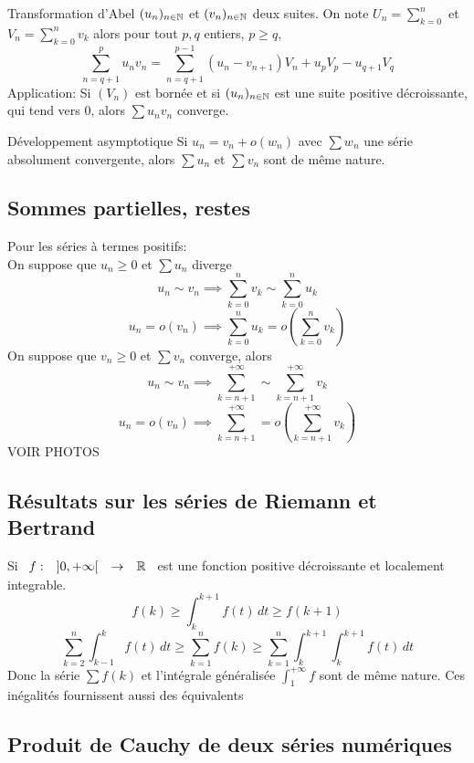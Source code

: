 \documentclass[]{report}
\begin{document}
\begin{dfprop}{Transformation d'Abel}{}
    $(u_n)_{n\in\mathbb{N}}$ et $(v_n)_{n\in\mathbb{N}}$ deux suites. On note $U_n=\sum_{k=0}^{n}$ et $V_n=\sum_{k=0}^{n} v_k$ alors pour tout $p,q$ entiers, $p\ge q$,
    \[\sum_{n=q+1}^{p} u_n v_n=\sum_{n=q+1}^{p-1}(u_n-v_{n+1}) V_n +u_p V_p -u_{q+1} V_q\]
    Application: Si $(V_n)$ est bornée et si $(u_n)_{n\in\mathbb{N}}$ est une suite positive décroissante, qui tend vers $0$, alors $\sum u_nv_n$ converge.
\end{dfprop}

\begin{dfprop}{Développement asymptotique}{}
    Si $u_n=v_n+o (w_n)$ avec $\sum w_n$ une série absolument convergente, alors $\sum u_n$ et $\sum v_n$ sont de même nature.
\end{dfprop}

\subsection*{Sommes partielles, restes}

Pour les séries à termes positifs:\\
On suppose que $u_n\ge 0$ et $\sum u_n$ diverge\\
\[u_n\sim v_n\implies  \sum_{k=0}^{n} v_k \sim \sum_{k=0}^{n} u_k\]
\[u_n=o(v_n)\implies \sum_{k=0}^{n} u_k = o\left( \sum_{k=0}^{n} v_k\right)\]
On suppose que $v_n\ge 0$ et $\sum v_n$ converge, alors\\
\[u_n \sim v_n\implies \sum_{k=n+1}^{+\infty}\sim \sum_{k=n+1}^{+\infty} v_k\]
\[u_n=o(v_n) \implies \sum_{k=n+1}^{+\infty}= o \left(\sum_{k=n+1}^{+\infty} v_k\right)\]
VOIR PHOTOS

\subsection*{Résultats sur les séries de Riemann et Bertrand}

Si $\begin{array}{ccccc} f : & ]0,+\infty[ & \to & \mathbb{R} \end{array}$ est une fonction positive décroissante et localement integrable.
\[f(k)\ge \int_{k}^{k+1} f(t)\, dt \ge f(k+1)\]
\[\sum_{k=2}^{n}\int_{k-1}^{k} f(t)\, dt \ge \sum_{k=1}^{n} f(k) \ge \sum_{k=1}^{n} \int_{k}^{k+1} \int_{k}^{k+1} f(t)\, dt\]
Donc la série $\sum f(k)$ et l'intégrale généralisée $\int_{1}^{+\infty}f$ sont de même nature. Ces inégalités fournissent aussi des équivalents

\subsection*{Produit de Cauchy de deux séries numériques}
\end{document}
